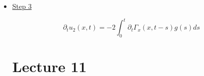 \begin{itemize}
\begin{PropBox}
\end{PropBox}
\begin{ProofBox}
        \begin{proof}
            The argument is exactly the same as in Step 1, and we skip it. 
        \end{proof}
    \end{ProofBox}
\item \underline{Step 3}
\begin{PropBox}
    \begin{Proposition}
        \begin{equation*}
            \partial_t u_2(x,t) = -2 \int_0^t \partial_t \Gamma_x(x,t-s) g(s) ds 
        \end{equation*}
    \end{Proposition}
    \end{PropBox}
    
\section{Lecture 11}


\end{itemize}
